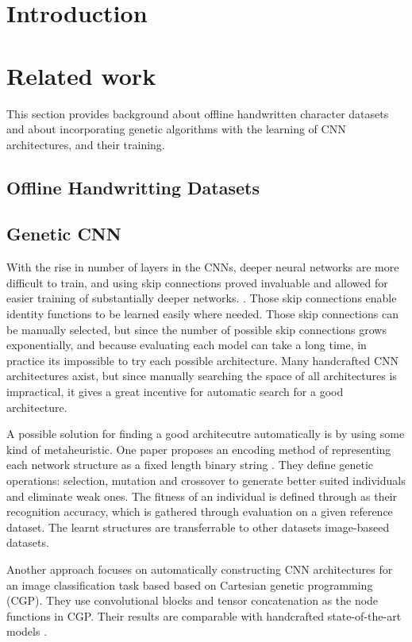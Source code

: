 \documentclass[eng]{simposium}
\begin{document}
\section{Introduction}

\section{Related work}

This section provides background about offline handwritten character datasets and about incorporating genetic algorithms 
with the learning of CNN architectures, and their training. 

\subsection{Offline Handwritting Datasets}

\subsection{Genetic CNN}


With the rise in number of layers in the CNNs, deeper neural networks are more difficult to train, and using skip connections proved invaluable and allowed 
for easier training of substantially deeper networks. \cite{5}. Those skip connections enable identity functions to be learned easily where needed.
Those skip connections can be manually selected, but since the number of possible skip connections grows exponentially, and because evaluating each model can take a long time, 
in practice its impossible to try each possible architecture.
Many handcrafted CNN architectures axist, but since manually searching the space of all architectures is impractical, it gives a great incentive for automatic search 
for a good architecture.

A possible solution for finding a good architecutre automatically is by using some kind of metaheuristic. 
One paper proposes an encoding method of representing each network structure as a fixed length binary string \cite{4}. 
They define genetic operations: selection, mutation and crossover to generate better suited individuals and eliminate weak ones.
The fitness of an individual is defined through as their recognition accuracy, which is gathered through evaluation on a given reference dataset.
The learnt structures are transferrable to other datasets image-baseed datasets.

Another approach focuses on automatically constructing CNN architectures for an image classification task based based on Cartesian genetic programming (CGP).
They use convolutional blocks and tensor concatenation as the node functions in CGP. Their results are comparable with handcrafted state-of-the-art models \cite{5}.
\end{document}
